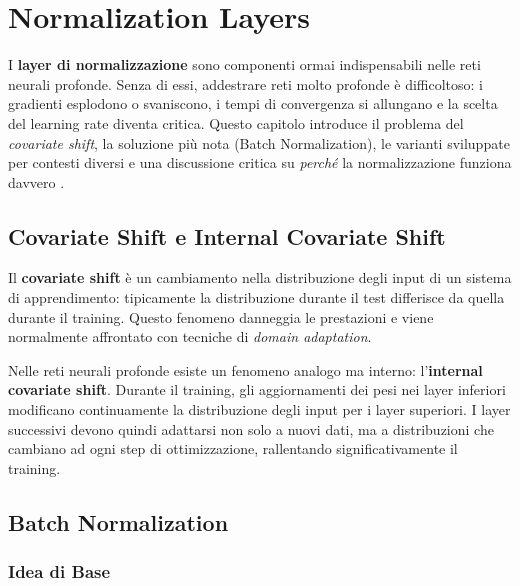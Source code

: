 \chapter{Normalization Layers}
\label{ch:normalization}

I \textbf{layer di normalizzazione} sono componenti ormai indispensabili nelle
reti neurali profonde. Senza di essi, addestrare reti molto profonde è
difficoltoso: i gradienti esplodono o svaniscono, i tempi di convergenza si
allungano e la scelta del learning rate diventa critica. Questo capitolo
introduce il problema del \emph{covariate shift}, la soluzione più nota
(Batch Normalization), le varianti sviluppate per contesti diversi e una
discussione critica su \emph{perché} la normalizzazione funziona davvero
\citep{bishop2024}.

\section{Covariate Shift e Internal Covariate Shift}
\label{sec:covariate-shift}

Il \textbf{covariate shift} è un cambiamento nella distribuzione degli input
di un sistema di apprendimento: tipicamente la distribuzione durante il test
differisce da quella durante il training. Questo fenomeno danneggia le
prestazioni e viene normalmente affrontato con tecniche di \emph{domain
adaptation}.

Nelle reti neurali profonde esiste un fenomeno analogo ma interno:
l'\textbf{internal covariate shift}. Durante il training, gli aggiornamenti
dei pesi nei layer inferiori modificano continuamente la distribuzione degli
input per i layer superiori. I layer successivi devono quindi adattarsi non
solo a nuovi dati, ma a distribuzioni che cambiano ad ogni step di
ottimizzazione, rallentando significativamente il training.

\section{Batch Normalization}
\label{sec:batch-norm}

\subsection{Idea di Base}
\label{subsec:bn-idea}

